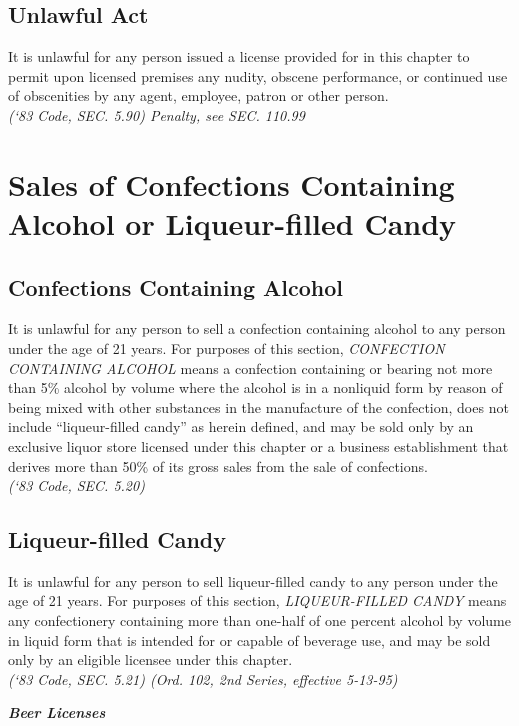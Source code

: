 \subsection{Unlawful Act}
It is unlawful for any person issued a license provided for in this chapter to permit upon licensed premises any nudity, obscene performance, or continued use of obscenities by any agent, employee, patron or other person.\\
\emph{(‘83 Code, SEC. 5.90)  Penalty, see SEC. 110.99}
\section{Sales of Confections Containing Alcohol or Liqueur-filled Candy}
\subsection{Confections Containing Alcohol}
It is unlawful for any person to sell a confection containing alcohol to any person under the age of 21 years.  For purposes of this section, \emph{CONFECTION CONTAINING ALCOHOL} means a confection containing or bearing not more than 5\% alcohol by volume where the alcohol is in a nonliquid form by reason of being mixed with other substances in the manufacture of the confection, does not include “liqueur-filled candy” as herein defined, and may be sold only by an exclusive liquor store licensed under this chapter or a business establishment that derives more than 50\% of its gross sales from the sale of confections.\\
\emph{(‘83 Code, SEC. 5.20)}
\subsection{Liqueur-filled Candy}
It is unlawful for any person to sell liqueur-filled candy to any person under the age of 21 years.  For purposes of this section, \emph{LIQUEUR-FILLED CANDY} means any confectionery containing more than one-half of one percent alcohol by volume in liquid form that is intended for or capable of beverage use, and may be sold only by an eligible licensee under this chapter.\\
\emph{(‘83 Code, SEC. 5.21)  (Ord. 102, 2nd Series, effective 5-13-95)}

\begin{center}
    \emph{\textbf{\LARGE{Beer Licenses}}}
\end{center}

\setcounter{section}{59}

